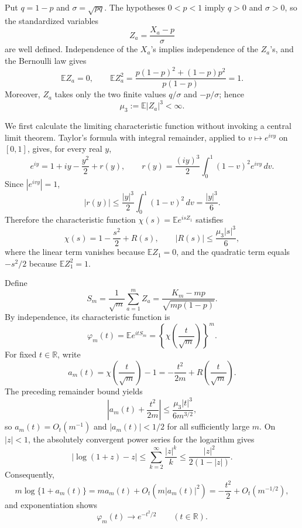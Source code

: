 Put \(q=1-p\) and \(\sigma=\sqrt{pq}\).  The hypotheses \(0<p<1\) imply \(q>0\) and \(\sigma>0\), so the standardized variables
\[
 Z_a=\frac{X_a-p}{\sigma}
\]
are well defined.  Independence of the \(X_a\)'s implies independence of the \(Z_a\)'s, and the Bernoulli law gives
\[
 \mathbb E Z_a=0,
 \qquad
 \mathbb E Z_a^2
 =\frac{p(1-p)^2+(1-p)p^2}{p(1-p)}=1.
\]
Moreover, \(Z_a\) takes only the two finite values \(q/\sigma\) and \(-p/\sigma\); hence
\[
 \mu_3:=\mathbb E|Z_a|^3<\infty.
\]

We first calculate the limiting characteristic function without invoking a central limit theorem.  Taylor's formula with integral remainder, applied to \(v\mapsto e^{ivy}\) on \([0,1]\), gives, for every real \(y\),
\[
 e^{iy}=1+iy-\frac{y^2}{2}+r(y),
 \qquad
 r(y)=\frac{(iy)^3}{2}\int_0^1(1-v)^2e^{ivy}\,dv.
\]
Since \(|e^{ivy}|=1\),
\[
 |r(y)|\leq \frac{|y|^3}{2}\int_0^1(1-v)^2\,dv
 =\frac{|y|^3}{6}.
\]
Therefore the characteristic function \(\chi(s)=\mathbb E e^{isZ_1}\) satisfies
\[
 \chi(s)=1-\frac{s^2}{2}+R(s),
 \qquad
 |R(s)|\leq \frac{\mu_3|s|^3}{6},
\]
where the linear term vanishes because \(\mathbb E Z_1=0\), and the quadratic term equals \(-s^2/2\) because \(\mathbb E Z_1^2=1\).

Define
\[
 S_m=\frac{1}{\sqrt m}\sum_{a=1}^m Z_a
 =\frac{K_m-mp}{\sqrt{mp(1-p)}}.
\]
By independence, its characteristic function is
\[
 \varphi_m(t)=\mathbb E e^{itS_m}
 =\left\{\chi\!\left(\frac{t}{\sqrt m}\right)\right\}^{m}.
\]
For fixed \(t\in\mathbb R\), write
\[
 a_m(t)=\chi\!\left(\frac{t}{\sqrt m}\right)-1
 =-\frac{t^2}{2m}+R\!\left(\frac{t}{\sqrt m}\right).
\]
The preceding remainder bound yields
\[
 \left|a_m(t)+\frac{t^2}{2m}\right|
 \leq \frac{\mu_3|t|^3}{6m^{3/2}},
\]
so \(a_m(t)=O_t(m^{-1})\) and \(|a_m(t)|<1/2\) for all sufficiently large \(m\).  On \(|z|<1\), the absolutely convergent power series for the logarithm gives
\[
 \left|\log(1+z)-z\right|
 \leq \sum_{k=2}^{\infty}\frac{|z|^k}{k}
 \leq \frac{|z|^2}{2(1-|z|)}.
\]
Consequently,
\[
 m\log\{1+a_m(t)\}
 =m a_m(t)+O_t\!\left(m|a_m(t)|^2\right)
 =-\frac{t^2}{2}+O_t(m^{-1/2}),
\]
and exponentiation shows
\[
 \varphi_m(t)\longrightarrow e^{-t^2/2}
 \qquad (t\in\mathbb R).
\]

